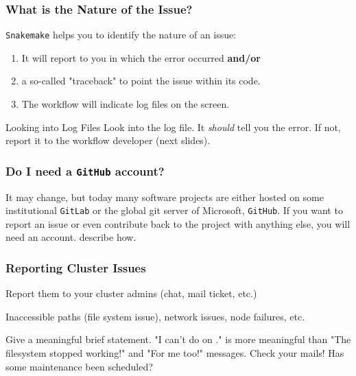 \begin{frame}
  \frametitle{What is the Nature of the Issue?}
  \texttt{Snakemake} helps you to identify the nature of an issue:
  \begin{enumerate}[<+->]
  	\item It will report to you in which  the error occurred \textbf{and/or}
  	\item a so-called "traceback" to point the issue within its code.
  	\item The workflow will indicate log files on the screen.
  \end{enumerate}
  \pause
  \begin{docs}{Looking into Log Files}
  	Look into the log file. It \textit{should} tell you the error. \pause If not, report it to the workflow developer (next slides). 
  \end{docs}
\end{frame}

\begin{frame}
  \frametitle{Do I need a \texttt{GitHub} account?}
  It may change, but today many software projects are either hosted on some institutional \texttt{GitLab} or the global git server of Microsoft, \texttt{GitHub}.\newline
  If you want to report an issue or even contribute back to the project with anything else, you will need an account.  describe how. 
\end{frame}

\begin{frame}
	\frametitle{Reporting Cluster Issues}
	\begin{question}[Where to?]
	  Report them to your cluster admins (chat, mail ticket, etc.)
	\end{question}
    \pause
    \begin{question}[What?]
      Inaccessible paths (file system issue), network issues, node failures, etc. 
    \end{question}
    \pause
    \begin{question}[How?]
      Give a meaningful brief statement. "I can't do  on ." is more meaningful than "The filesystem stopped working!" and "For me too!" messages.\newline
      \bcattention Check your mails! Has some maintenance been scheduled?
    \end{question}	
\end{frame}

